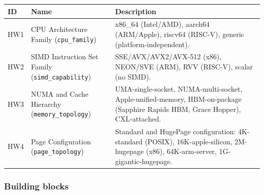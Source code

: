 \begin{scriptsize}
\begin{longtable}{@{}>{\raggedright\arraybackslash}p{1.8cm} >{\raggedright\arraybackslash}p{3.2cm} >{\raggedright\arraybackslash}p{8.5cm}@{}}
\toprule
ID & Name & Description \\
\midrule
\endhead%
HW1 & CPU Architecture Family (\texttt{cpu\_\allowbreak{}family}) & x86\_\allowbreak{}64 (Intel/\allowbreak{}AMD), aarch64 (ARM/\allowbreak{}Apple), riscv64 (RISC-V), generic (platform-independent). \\
HW2 & SIMD Instruction Set Family (\texttt{simd\_\allowbreak{}capability}) & SSE/\allowbreak{}AVX/\allowbreak{}AVX2/\allowbreak{}AVX-512 (x86), NEON/\allowbreak{}SVE (ARM), RVV (RISC-V), scalar (no SIMD). \\
HW3 & NUMA and Cache Hierarchy (\texttt{memory\_\allowbreak{}topology}) & UMA-single-socket, NUMA-multi-socket, Apple-unified-memory, HBM-on-package (Sapphire Rapids HBM, Grace Hopper), CXL-attached. \\
HW4 & Page Configuration (\texttt{page\_\allowbreak{}topology}) & Standard and HugePage configuration: 4K-standard (POSIX), 16K-apple-silicon, 2M-hugepage (x86), 64K-arm-server, 1G-gigantic-hugepage. \\
\bottomrule
\end{longtable}
\end{scriptsize}

\subsubsection*{Building blocks}

